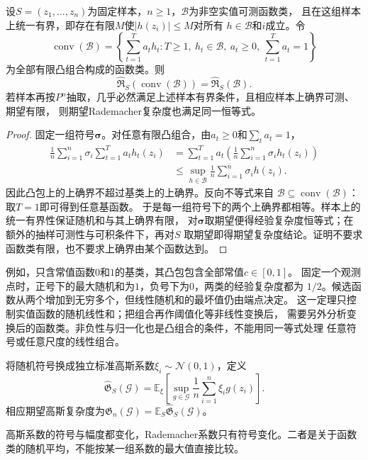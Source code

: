 \begin{theorem}[凸组合的Rademacher复杂度]
\label{thm:ensemble-convex-hull}
设$S=(z_1,\ldots,z_n)$为固定样本，$n\geq1$，$\mathcal B$为非空实值可测函数类，
且在这组样本上统一有界，即存在有限$M$使$|h(z_i)|\leq M$对所有
$h\in\mathcal B$和$i$成立。令
\[
 \operatorname{conv}(\mathcal B)
 =\left\{\sum_{t=1}^T a_t h_t:
 T\geq1,\ h_t\in\mathcal B,\ a_t\geq0,\ \sum_{t=1}^T a_t=1\right\}
\]
为全部有限凸组合构成的函数类。则
\[
 \widehat{\mathfrak R}_S(\operatorname{conv}(\mathcal B))
 =\widehat{\mathfrak R}_S(\mathcal B).
\]
若样本再按$P^n$抽取，几乎必然满足上述样本有界条件，且相应样本上确界可测、期望有限，
则期望Rademacher复杂度也满足同一恒等式。
\end{theorem}

\begin{proof}
固定一组符号$\bm\sigma$。对任意有限凸组合，由$a_t\geq0$和$\sum_ta_t=1$，
\[
 \begin{aligned}
 \frac1n\sum_{i=1}^n\sigma_i\sum_{t=1}^T a_t h_t(z_i)
 &=\sum_{t=1}^T a_t
    \left(\frac1n\sum_{i=1}^n\sigma_i h_t(z_i)\right)\\
 &\leq\sup_{h\in\mathcal B}\frac1n\sum_{i=1}^n\sigma_i h(z_i).
 \end{aligned}
\]
因此凸包上的上确界不超过基类上的上确界。反向不等式来自
$\mathcal B\subseteq\operatorname{conv}(\mathcal B)$：取$T=1$即可得到任意基函数。
于是每一组符号下的两个上确界都相等。样本上的统一有界性保证随机和与其上确界有限，
对$\bm\sigma$取期望便得经验复杂度恒等式；在额外的抽样可测性与可积条件下，再对$S$
取期望即得期望复杂度结论。证明不要求函数类有限，也不要求上确界由某个函数达到。
\end{proof}

例如，只含常值函数$0$和$1$的基类，其凸包包含全部常值$c\in[0,1]$。
固定一个观测点时，正号下的最大随机和为$1$，负号下为$0$，两类的经验复杂度都为
$1/2$。候选函数从两个增加到无穷多个，但线性随机和的最坏值仍由端点决定。
这一定理只控制实值函数的随机线性和；把组合再作阈值化等非线性变换后，
需要另外分析变换后的函数类。非负性与归一化也是凸组合的条件，不能用同一等式处理
任意符号或任意尺度的线性组合。

\begin{definition}[经验高斯复杂度]
  \label{def:gaussian-complexity}
  将随机符号换成独立标准高斯系数\(\xi_i\sim\mathcal N(0,1)\)，定义
  \[
    \widehat{\mathfrak G}_S(\mathcal G)
    =\mathbb E_\xi\left[\sup_{g\in\mathcal G}\frac1n\sum_{i=1}^n\xi_i g(z_i)\right].
  \]
  相应期望高斯复杂度为\(\mathfrak G_n(\mathcal G)=\mathbb E_S\widehat{\mathfrak G}_S(\mathcal G)\)。
\end{definition}
高斯系数的符号与幅度都变化，Rademacher系数只有符号变化。二者是关于函数类的随机平均，不能按某一组系数的最大值直接比较。

